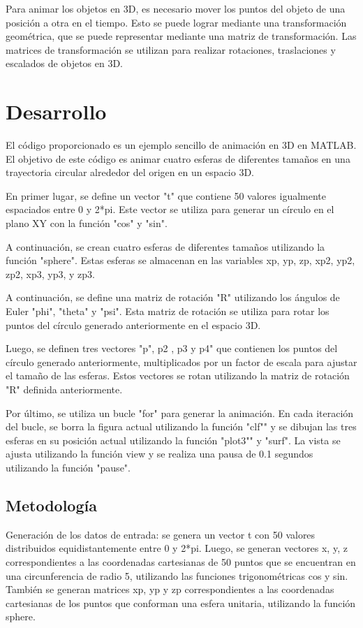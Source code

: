 \documentclass[12pt]{article}
\begin{document}
	Para animar los objetos en 3D, es necesario mover los puntos del objeto de una posición a otra en el tiempo. Esto se puede lograr mediante una transformación geométrica, que se puede representar mediante una matriz de transformación. Las matrices de transformación se utilizan para realizar rotaciones, traslaciones y escalados de objetos en 3D.
	
	\section{Desarrollo}
	El código proporcionado es un ejemplo sencillo de animación en 3D en MATLAB. El objetivo de este código es animar cuatro esferas de diferentes tamaños en una trayectoria circular alrededor del origen en un espacio 3D.
	
	En primer lugar, se define un vector "t" que contiene 50 valores igualmente espaciados entre 0 y 2*pi. Este vector se utiliza para generar un círculo en el plano XY con la función "cos" y "sin".
	
	A continuación, se crean cuatro esferas de diferentes tamaños utilizando la función "sphere". Estas esferas se almacenan en las variables xp, yp, zp, xp2, yp2, zp2, xp3, yp3, y zp3.
	
	A continuación, se define una matriz de rotación "R" utilizando los ángulos de Euler "phi", "theta" y "psi". Esta matriz de rotación se utiliza para rotar los puntos del círculo generado anteriormente en el espacio 3D.
	
	Luego, se definen tres vectores "p", p2 , p3 y p4" que contienen los puntos del círculo generado anteriormente, multiplicados por un factor de escala para ajustar el tamaño de las esferas. Estos vectores se rotan utilizando la matriz de rotación "R" definida anteriormente.
	
	Por último, se utiliza un bucle "for" para generar la animación. En cada iteración del bucle, se borra la figura actual utilizando la función "clf"" y se dibujan las tres esferas en su posición actual utilizando la función "plot3"" y "surf". La vista se ajusta utilizando la función view y se realiza una pausa de 0.1 segundos utilizando la función "pause".
	
	\subsection{Metodología}
	    Generación de los datos de entrada: se genera un vector t con 50 valores distribuidos equidistantemente entre 0 y 2*pi. Luego, se generan vectores x, y, z correspondientes a las coordenadas cartesianas de 50 puntos que se encuentran en una circunferencia de radio 5, utilizando las funciones trigonométricas cos y sin. También se generan matrices xp, yp y zp correspondientes a las coordenadas cartesianas de los puntos que conforman una esfera unitaria, utilizando la función sphere.
	
\end{document}
